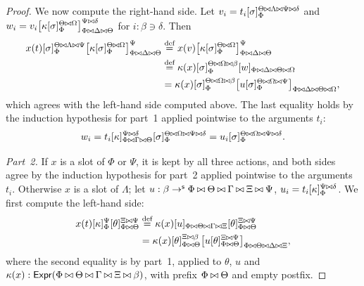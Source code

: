 \begin{proof}
    We now compute the right-hand side. Let $v_i = t_i[\sigma]_\Phi^{\Theta \mathbin{\bowtie} \Lambda \mathbin{\bowtie} \Psi \mathbin{\bowtie} \delta}$ and $w_i = v_i\big[\kappa[\sigma]_\Phi^{\Theta \mathbin{\bowtie} \Omega}\big]_{\Phi \mathbin{\bowtie} \Delta \mathbin{\bowtie} \Theta}^{\Psi \mathbin{\bowtie} \delta}$ for $i : \beta \ni \delta$. Then
    \begin{align*}
        x(t)[\sigma]_\Phi^{\Theta \mathbin{\bowtie} \Lambda \mathbin{\bowtie} \Psi}\big[\kappa[\sigma]_\Phi^{\Theta \mathbin{\bowtie} \Omega}\big]_{\Phi \mathbin{\bowtie} \Delta \mathbin{\bowtie} \Theta}^{\Psi}
        &\overset{\textnormal{def}}{=} x(v)\big[\kappa[\sigma]_\Phi^{\Theta \mathbin{\bowtie} \Omega}\big]_{\Phi \mathbin{\bowtie} \Delta \mathbin{\bowtie} \Theta}^{\Psi}\\
        &\overset{\textnormal{def}}{=} \kappa(x)[\sigma]_\Phi^{\Theta \mathbin{\bowtie} \Omega \mathbin{\bowtie} \beta}[w]_{\Phi \mathbin{\bowtie} \Delta \mathbin{\bowtie} \Theta \mathbin{\bowtie} \Omega}\\
        &= \kappa(x)[\sigma]_\Phi^{\Theta \mathbin{\bowtie} \Omega \mathbin{\bowtie} \beta}\big[u[\sigma]_\Phi^{\Theta \mathbin{\bowtie} \Omega \mathbin{\bowtie} \Psi}\big]_{\Phi \mathbin{\bowtie} \Delta \mathbin{\bowtie} \Theta \mathbin{\bowtie} \Omega},
    \end{align*}
    which agrees with the left-hand side computed above. The last equality holds by the induction hypothesis for part~1 applied pointwise to the arguments $t_i$:
    \[
    w_i = t_i[\kappa]_{\Phi \mathbin{\bowtie} \Gamma \mathbin{\bowtie} \Theta}^{\Psi \mathbin{\bowtie} \delta}[\sigma]_\Phi^{\Theta \mathbin{\bowtie} \Omega \mathbin{\bowtie} \Psi \mathbin{\bowtie} \delta} = u_i[\sigma]_\Phi^{\Theta \mathbin{\bowtie} \Omega \mathbin{\bowtie} \Psi \mathbin{\bowtie} \delta}.
    \]

    \emph{Part~2.} If $x$ is a slot of $\Phi$ or $\Psi$, it is kept by all three actions, and both sides agree by the induction hypothesis for part~2 applied pointwise to the arguments $t_i$. Otherwise $x$ is a slot of $\Lambda$; let $u : \beta \to^{\mathsf{s}} \Phi \mathbin{\bowtie} \Theta \mathbin{\bowtie} \Gamma \mathbin{\bowtie} \Xi \mathbin{\bowtie} \Psi$, $u_i = t_i[\kappa]_\Phi^{\Psi \mathbin{\bowtie} \delta}$. We first compute the left-hand side:
    \begin{align*}
        x(t)[\kappa]_\Phi^\Psi[\theta]_{\Phi \mathbin{\bowtie} \Theta}^{\Xi \mathbin{\bowtie} \Psi}
        &\overset{\textnormal{def}}{=} \kappa(x)[u]_{\Phi \mathbin{\bowtie} \Theta \mathbin{\bowtie} \Gamma \mathbin{\bowtie} \Xi}[\theta]_{\Phi \mathbin{\bowtie} \Theta}^{\Xi \mathbin{\bowtie} \Psi}\\
        &= \kappa(x)[\theta]_{\Phi \mathbin{\bowtie} \Theta}^{\Xi \mathbin{\bowtie} \beta}\big[u[\theta]_{\Phi \mathbin{\bowtie} \Theta}^{\Xi \mathbin{\bowtie} \Psi}\big]_{\Phi \mathbin{\bowtie} \Theta \mathbin{\bowtie} \Delta \mathbin{\bowtie} \Xi},
    \end{align*}
    where the second equality is by part~1, applied to $\theta$, $u$ and $\kappa(x) : \mathsf{Expr}(\Phi \mathbin{\bowtie} \Theta \mathbin{\bowtie} \Gamma \mathbin{\bowtie} \Xi \mathbin{\bowtie} \beta)$, with prefix $\Phi \mathbin{\bowtie} \Theta$ and empty postfix.


\end{proof}
